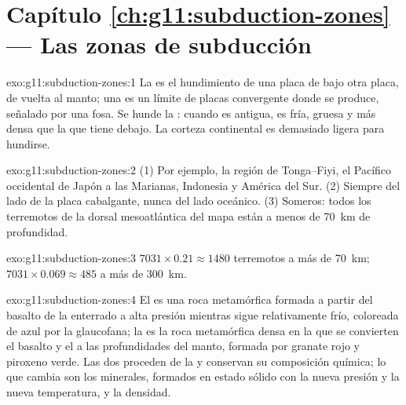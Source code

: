 \section*{Capítulo \ref{ch:g11:subduction-zones} --- Las zonas de subducción}

\begin{solution}{exo:g11:subduction-zones:1}
La  es el hundimiento de una placa de  bajo otra
placa, de vuelta al manto; una  es un límite de placas
convergente donde se produce, señalado por una fosa. Se hunde la : cuando es antigua, es fría, gruesa y más densa que la 
que tiene debajo. La corteza continental es demasiado ligera para hundirse.
\end{solution}

\begin{solution}{exo:g11:subduction-zones:2}
(1) Por ejemplo, la región de Tonga--Fiyi, el Pacífico occidental de Japón a
las Marianas, Indonesia y América del Sur. (2) Siempre del lado de la placa
cabalgante, nunca del lado oceánico. (3) Someros: todos los terremotos de la
dorsal mesoatlántica del mapa están a menos de \qty{70}{km} de profundidad.
\end{solution}

\begin{solution}{exo:g11:subduction-zones:3}
$7031 \times 0.21 \approx 1480$ terremotos a más de \qty{70}{km};
$7031 \times 0.069 \approx 485$ a más de \qty{300}{km}.
\end{solution}

\begin{solution}{exo:g11:subduction-zones:4}
El  es una roca metamórfica formada a partir del basalto de la
 enterrado a alta presión mientras sigue relativamente frío,
coloreada de azul por la glaucofana; la  es la roca metamórfica densa
en la que se convierten el basalto y el  a las profundidades del manto,
formada por granate rojo y piroxeno verde. Las dos proceden de la  y conservan su composición química; lo que cambia son los minerales,
formados en estado sólido con la nueva presión y la nueva temperatura, y la
densidad.
\end{solution}

